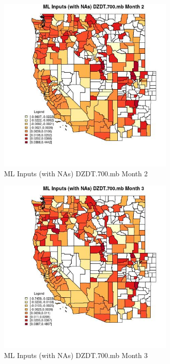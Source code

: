 \begin{figure} 
\centering  
\includegraphics[width=0.77\textwidth]{Code_Outputs/Report_ML_input_PM25_Step4_part_f_de_duplicated_aves_prioritize_24hr_obswNAs_CountyDZDT700mbmedianMonth2.jpg} 
\caption{\label{fig:Report_ML_input_PM25_Step4_part_f_de_duplicated_aves_prioritize_24hr_obswNAsCountyDZDT700mbmedianMonth2}ML Inputs (with NAs) DZDT.700.mb Month 2} 
\end{figure} 
 

\clearpage 

\begin{figure} 
\centering  
\includegraphics[width=0.77\textwidth]{Code_Outputs/Report_ML_input_PM25_Step4_part_f_de_duplicated_aves_prioritize_24hr_obswNAs_CountyDZDT700mbmedianMonth3.jpg} 
\caption{\label{fig:Report_ML_input_PM25_Step4_part_f_de_duplicated_aves_prioritize_24hr_obswNAsCountyDZDT700mbmedianMonth3}ML Inputs (with NAs) DZDT.700.mb Month 3} 
\end{figure} 
 

